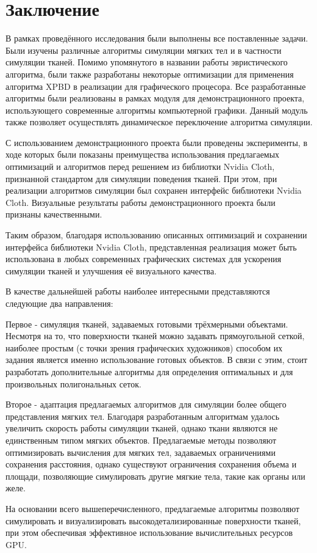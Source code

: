 \chapter*{Заключение} \label{ch-conclusion}
	В рамках проведённого исследования были выполнены все поставленные задачи. Были изучены различные алгоритмы симуляции мягких тел и в частности симуляции тканей. Помимо упомянутого в названии работы эвристического алгоритма, были также разработаны некоторые оптимизации для применения алгоритма XPBD в реализации для графического процесора. Все разработанные алгоритмы были реализованы в рамках модуля для демонстрационного проекта, использующего современные алгоритмы компьютерной графики. Данный модуль также позволяет осуществлять динамическое переключение алгоритма симуляции.
	
	С использованием демонстрационного проекта были проведены эксперименты, в ходе которых были показаны преимущества использования предлагаемых оптимизаций и алгоритмов перед решением из библиотки Nvidia Cloth, признанной стандартом для симуляции поведения тканей. При этом, при реализации алгоритмов симуляции был сохранен интерфейс библиотеки Nvidia Cloth. Визуальные результаты работы демонстрационного проекта были признаны качественными. 
	
	Таким образом, благодаря использованию описанных оптимизаций и сохранении интерфейса библиотеки Nvidia Cloth, представленная реализация может быть использована в любых современных графических системах для ускорения симуляции тканей и улучшения её визуального качества. 
	
	В качестве дальнейшей работы наиболее интересными представляются следующие два направления:
	
	Первое - симуляция тканей, задаваемых готовыми трёхмерными объектами. Несмотря на то, что поверхности тканей можно задавать прямоугольной сеткой, наиболее простым (с точки зрения графических художников) способом их задания является именно использование готовых объектов. В связи с этим, стоит разработать дополнительные алгоритмы для определения оптимальных  и  для произвольных полигональных сеток.
	
	Второе - адаптация предлагаемых алгоритмов для симуляции более общего представления мягких тел. Благодаря разработанным алгоритмам удалось увеличить скорость работы симуляции тканей, однако ткани являются не единственным типом мягких объектов. Предлагаемые методы позволяют оптимизировать вычисления для мягких тел, задаваемых ограничениями сохранения расстояния, однако существуют ограничения сохранения объема и площади, позволяющие симулировать другие мягкие тела, такие как органы или желе.
	
	На основании всего вышеперечисленного, предлагаемые алгоритмы позволяют симулировать и визуализировать высокодетализированные поверхности тканей, при этом обеспечивая эффективное использование вычислительных ресурсов GPU.